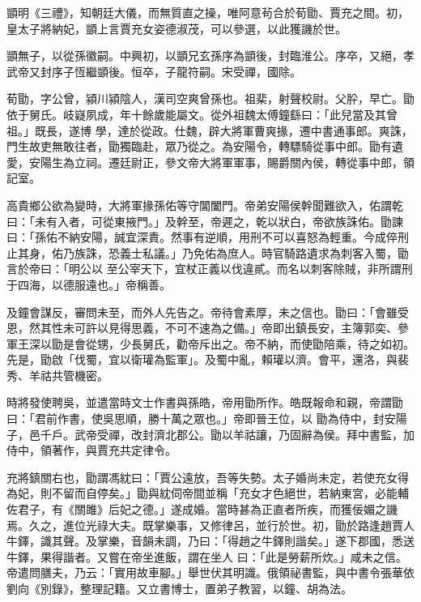 \begin{pinyinscope}
 顗明《三禮》，知朝廷大儀，而無質直之操，唯阿意茍合於荀勖、賈充之間。初，皇太子將納妃，顗上言賈充女姿德淑茂，可以參選，以此獲譏於世。



 顗無子，以從孫徽嗣。中興初，以顗兄玄孫序為顗後，封臨淮公。序卒，又絕，孝武帝又封序子恆繼顗後。恒卒，子龍符嗣。宋受禪，國除。



 荀勖，字公曾，潁川潁陰人，漢司空爽曾孫也。祖棐，射聲校尉。父肸，早亡。勖依于舅氏。岐嶷夙成，年十餘歲能屬文。從外祖魏太傅鐘繇曰：「此兒當及其曾祖。」既長，遂博
 學，達於從政。仕魏，辟大將軍曹爽掾，遷中書通事郎。爽誅，門生故吏無敢往者，勖獨臨赴，眾乃從之。為安陽令，轉驃騎從事中郎。勖有遺愛，安陽生為立祠。遷廷尉正，參文帝大將軍軍事，賜爵關內侯，轉從事中郎，領記室。



 高貴鄉公欲為變時，大將軍掾孫佑等守閶闔門。帝弟安陽侯幹聞難欲入，佑謂乾曰：「未有入者，可從東掖門。」及幹至，帝遲之，乾以狀白，帝欲族誅佑。勖諫曰：「孫佑不納安陽，誠宜深責。然事有逆順，用刑不可以喜怒為輕重。今成倅刑止其身，佑乃族誅，恐義士私議。」乃免佑為庶人。時官騎路遺求為刺客入蜀，勖言於帝曰：「明公以
 至公宰天下，宜杖正義以伐違貳。而名以刺客除賊，非所謂刑于四海，以德服遠也。」帝稱善。



 及鐘會謀反，審問未至，而外人先告之。帝待會素厚，未之信也。勖曰：「會雖受恩，然其性未可許以見得思義，不可不速為之備。」帝即出鎮長安，主簿郭奕、參軍王深以勖是會從甥，少長舅氏，勸帝斥出之。帝不納，而使勖陪乘，待之如初。先是，勖啟「伐蜀，宜以衛瓘為監軍」。及蜀中亂，賴瓘以濟。會平，還洛，與裴秀、羊祜共管機密。



 時將發使聘吳，並遣當時文士作書與孫皓，帝用勖所作。皓既報命和親，帝謂勖曰：「君前作書，使吳思順，勝十萬之眾也。」帝即晉王位，以
 勖為侍中，封安陽子，邑千戶。武帝受禪，改封濟北郡公。勖以羊祜讓，乃固辭為侯。拜中書監，加侍中，領著作，與賈充共定律令。



 充將鎮關右也，勖謂馮紞曰：「賈公遠放，吾等失勢。太子婚尚未定，若使充女得為妃，則不留而自停矣。」勖與紞伺帝間並稱「充女才色絕世，若納東宮，必能輔佐君子，有《關雎》后妃之德。」遂成婚。當時甚為正直者所疾，而獲佞媚之譏焉。久之，進位光祿大夫。既掌樂事，又修律呂，並行於世。初，勖於路逢趙賈人牛鐸，識其聲。及掌樂，音韻未調，乃曰：「得趙之牛鐸則諧矣。」遂下郡國，悉送牛鐸，果得諧者。又嘗在帝坐進飯，謂在坐人
 曰：「此是勞薪所炊。」咸未之信。帝遣問膳夫，乃云：「實用故車腳。」舉世伏其明識。俄領祕書監，與中書令張華依劉向《別錄》，整理記籍。又立書博士，置弟子教習，以鐘、胡為法。




\end{pinyinscope}
